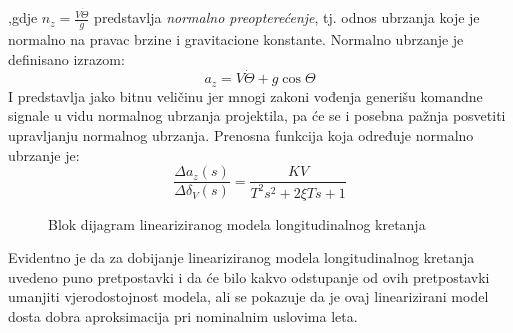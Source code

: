 ,gdje $n_z = \frac{V\dot{\Theta}}{g}$ predstavlja \textit{normalno preopterećenje}, tj. odnos ubrzanja koje je normalno na pravac brzine i gravitacione konstante. 
Normalno ubrzanje je definisano izrazom:
\begin{equation}
    a_z = V\dot{\Theta} + g\cos\Theta
\end{equation}
I predstavlja jako bitnu veličinu jer mnogi zakoni vođenja generišu komandne signale u vidu normalnog ubrzanja projektila, pa će se i 
posebna pažnja posvetiti upravljanju normalnog ubrzanja. Prenosna funkcija koja određuje normalno ubrzanje je:
\begin{equation}
    \frac{\Delta a_z(s)}{\Delta \delta_V(s)} =\frac{KV}{T^2s^2+2\xi Ts+1}
\end{equation}
\begin{figure}[!ht]
    \centering
\caption{Blok dijagram lineariziranog modela longitudinalnog kretanja}
\label{fig:diagLongi}
\end{figure}
Evidentno je da za dobijanje lineariziranog modela longitudinalnog kretanja uvedeno 
puno pretpostavki i da će bilo kakvo odstupanje od ovih pretpostavki umanjiti vjerodostojnost modela, 
ali se pokazuje da je ovaj linearizirani model dosta dobra aproksimacija pri nominalnim uslovima leta. 
